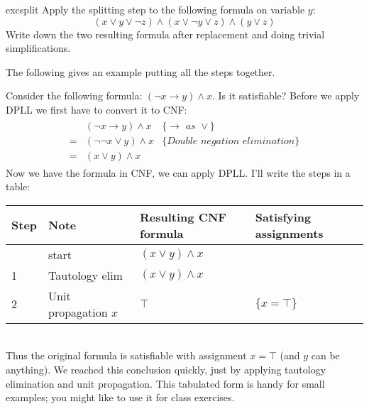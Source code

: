 \begin{restatable}{exc}{split}
Apply the splitting step to the following formula on variable $y$:
%
\begin{equation*}
(x \vee y \vee \neg z) \wedge (x \vee \neg y \vee z) \wedge (y \vee z)
\end{equation*}
%
Write down the two resulting formula after replacement and doing trivial
simplifications.
\end{restatable}

The following gives an example putting all the steps together.

\begin{example}
  Consider the following formula: $(\neg x \rightarrow y) \wedge x$.
  Is it satisfiable? Before we apply DPLL we first have to
convert it to CNF:
   \begin{align*}
      \begin{array}{lll}
        & (\neg x \rightarrow y) \wedge x & \textit{\{$\rightarrow$ as
                                          $\vee$\}} \\
      = & (\neg \neg x \vee y) \wedge x & \textit{\{Double negation
                                          elimination}\} \\
      = & (x \vee y) \wedge x &
      \end{array}
    \end{align*}
  Now we have the formula in CNF, we can apply DPLL. I'll write
  the steps in a table: \\[1em]
%
  \vspace{2em}
  \begin{tabular}{l|l|l|l}
    Step & Note & Resulting CNF formula & Satisfying assignments \\ \hline
      & start & $(x \vee y) \wedge x$ &  \\
    1 & Tautology elim & $(x \vee y) \wedge x$ &  \\
    2 & Unit propagation $x$ & $\top$ & $\{x = \top\}$
  \end{tabular} \\[-1em]
  Thus the original formula is satisfiable with assignment $x = \top$
  (and $y$ can be anything). We reached this conclusion quickly,
  just by applying tautology elimination and unit propagation.
This tabulated form is handy for small examples; you might like
to use it for class exercises.
\end{example}

